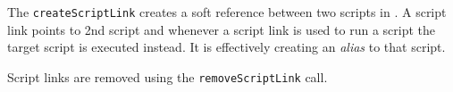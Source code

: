 The \verb+createScriptLink+ creates a soft reference between two scripts in \Rapture. A script link
points to 2nd script and whenever a script link is used to run a script the target script is
executed instead. It is effectively creating an \emph{alias} to that script.

Script links are removed using the \verb+removeScriptLink+ call.
